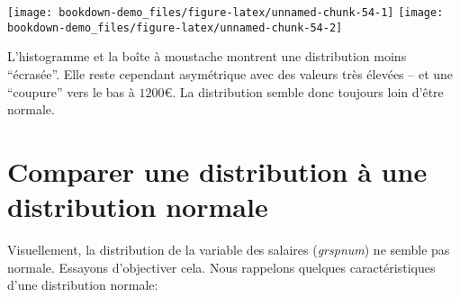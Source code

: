 \documentclass[
]{book}
\newenvironment{Shaded}{\begin{snugshade}}{\end{snugshade}}
\newcommand{\AttributeTok}[1]{\textcolor[rgb]{0.77,0.63,0.00}{#1}}
\newcommand{\CommentTok}[1]{\textcolor[rgb]{0.56,0.35,0.01}{\textit{#1}}}
\newcommand{\FunctionTok}[1]{\textcolor[rgb]{0.00,0.00,0.00}{#1}}
\newcommand{\NormalTok}[1]{#1}
\newcommand{\SpecialCharTok}[1]{\textcolor[rgb]{0.00,0.00,0.00}{#1}}
\newcommand{\StringTok}[1]{\textcolor[rgb]{0.31,0.60,0.02}{#1}}
\begin{document}
\begin{Shaded}
\end{Shaded}

\texttt{[image: bookdown-demo\_files/figure-latex/unnamed-chunk-54-1]} \texttt{[image: bookdown-demo\_files/figure-latex/unnamed-chunk-54-2]}

L'histogramme et la boîte à moustache montrent une distribution moins ``écrasée''. Elle reste cependant asymétrique avec des valeurs très élevées -- et une ``coupure'' vers le bas à \(1200€\). La distribution semble donc toujours loin d'être normale.

\hypertarget{comparer-une-distribution-uxe0-une-distribution-normale}{%
\section{Comparer une distribution à une distribution normale}\label{comparer-une-distribution-uxe0-une-distribution-normale}}

Visuellement, la distribution de la variable des salaires (\emph{grspnum}) ne semble pas normale. Essayons d'objectiver cela. Nous rappelons quelques caractéristiques d'une distribution normale:
\end{document}
